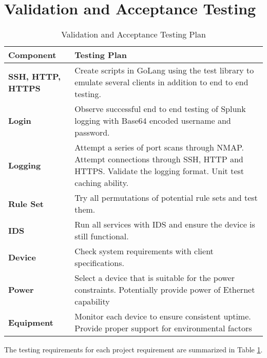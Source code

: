 \section{Validation and Acceptance Testing}


\begin{table}
\renewcommand{\arraystretch}{1.5}
\centering
\begin{tabular}{l | p{10cm}}
\textup{\Large {\bf Component}} & \textup{\Large {\bf Testing Plan}} \\
\hline \hline
\textbf{SSH, HTTP, HTTPS} & Create scripts in GoLang using the test library to emulate several clients in addition to end to end testing. \\
\textbf{Login} & Observe successful end to end testing of Splunk logging with Base64 encoded username and password.\\
\textbf{Logging} & Attempt a series of port scans through NMAP. Attempt connections through SSH, HTTP and HTTPS. Validate the logging format. Unit test caching ability.  \\
\textbf{Rule Set} & Try all permutations of potential rule sets and test them. \\
\textbf{IDS} & Run all services with IDS and ensure the device is still functional. \\
\textbf{Device} & Check system requirements with client specifications. \\
\textbf{Power} & Select a device that is suitable for the power constraints.  Potentially provide power of Ethernet capability \\
\textbf{Equipment} & Monitor each device to ensure consistent uptime. Provide proper support for environmental factors\\
\end{tabular}
\caption{Validation and Acceptance Testing Plan}
\label{table:vatest}
\end{table}

The testing requirements for each project requirement are summarized in
Table \ref{table:vatest}.
